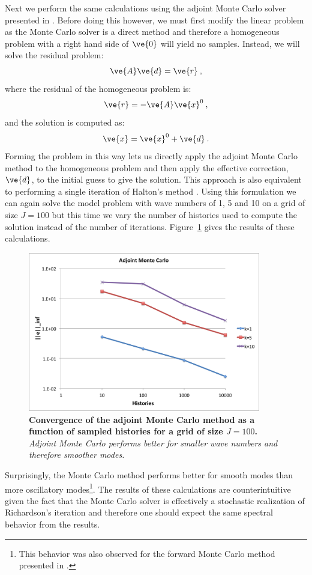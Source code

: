 \documentclass[note]{TechNote}
\begin{document}
Next we perform the same calculations using the adjoint Monte Carlo
solver presented in \cite{evans_monte_2012}. Before doing this
however, we must first modify the linear problem as the Monte Carlo
solver is a direct method and therefore a homogeneous problem with a
right hand side of $\ve{0}$ will yield no samples. Instead, we will
solve the residual problem:
\begin{equation}
  \ve{A}\ve{d} = \ve{r}\:,
  \label{eq:residual_problem}
\end{equation}
where the residual of the homogeneous problem is:
\begin{equation}
  \ve{r} = -\ve{A}\ve{x}^0\:,
  \label{eq:homogenous_residual}
\end{equation}
and the solution is computed as:
\begin{equation}
  \ve{x} = \ve{x}^0 + \ve{d}\:.
  \label{eq:residual_solution}
\end{equation}
Forming the problem in this way lets us directly apply the adjoint
Monte Carlo method to the homogeneous problem and then apply the
effective correction, $\ve{d}$, to the initial guess to give the
solution. This approach is also equivalent to performing a single
iteration of Halton's method \cite{halton_sequential_1962}. Using this
formulation we can again solve the model problem with wave numbers of
1, 5 and 10 on a grid of size $J = 100$ but this time we vary the
number of histories used to compute the solution instead of the number
of iterations. Figure~\ref{fig:adjoint_mc} gives the results of these
calculations.
\begin{figure}[h!]
  \begin{center}
    \includegraphics[width=4in]{adjoint_mc.png}
  \end{center}
  \caption{\textbf{Convergence of the adjoint Monte Carlo method as a
      function of sampled histories for a grid of size $J = 100$.}
    \textit{Adjoint Monte Carlo performs better for smaller wave
      numbers and therefore smoother modes.}}
  \label{fig:adjoint_mc}
\end{figure}
Surprisingly, the Monte Carlo method performs better for smooth modes
than more oscillatory modes\footnote{This behavior was also observed
  for the forward Monte Carlo method presented in
  \cite{evans_monte_2012}.}. The results of these calculations are
counterintuitive given the fact that the Monte Carlo solver is
effectively a stochastic realization of Richardson's iteration and
therefore one should expect the same spectral behavior from the
results.
\end{document}
